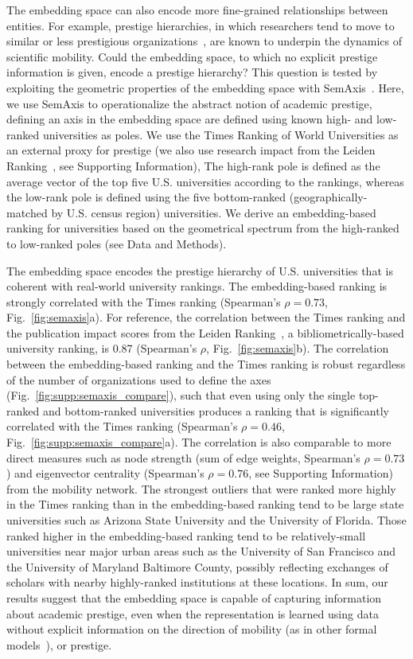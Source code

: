 \documentclass[12pt]{article} %
\def\SI{Supporting Information}
\begin{document}
The embedding space can also encode more fine-grained relationships between entities.
For example, prestige hierarchies, in which researchers tend to move to similar or less prestigious organizations~\autocite{deville2014career, clauset2015hierarchy}, are known to underpin the dynamics of scientific mobility.
Could the embedding space, to which no explicit prestige information is given, encode a prestige hierarchy?
This question is tested by exploiting the geometric properties of the embedding space with SemAxis~\autocite{an2018semaxis}.
Here, we use SemAxis to operationalize the abstract notion of academic prestige, defining an axis in the embedding space are defined using known high- and low-ranked universities as poles.
We use the Times Ranking of World Universities as an external proxy for prestige (we also use research impact from the Leiden Ranking~\autocite{waltman2012leidenrankings}, see \SI),
The high-rank pole is defined as the average vector of the top five U.S. universities according to the rankings, whereas the low-rank pole is defined using the five bottom-ranked (geographically-matched by U.S. census region) universities.
We derive an embedding-based ranking for universities based on the geometrical spectrum from the high-ranked to low-ranked poles (see Data and Methods).

The embedding space encodes the prestige hierarchy of U.S. universities that is coherent with real-world university rankings.
The embedding-based ranking is strongly correlated with the Times ranking (Spearman's $\rho = 0.73$, Fig.~\ref{fig:semaxis}a).
For reference, the correlation between the Times ranking and the publication impact scores from the Leiden Ranking~\autocite{waltman2012leidenrankings}, a bibliometrically-based university ranking, is 0.87 (Spearman's $\rho$, Fig.~\ref{fig:semaxis}b).
The correlation between the embedding-based ranking and the Times ranking is robust regardless of the number of organizations used to define the axes (Fig.~\ref{fig:supp:semaxis_compare}), such that even using only the single top-ranked and bottom-ranked universities produces a ranking that is significantly correlated with the Times ranking (Spearman's $\rho = 0.46$, Fig.~\ref{fig:supp:semaxis_compare}a).
The correlation is also comparable to more direct measures such as node strength (sum of edge weights, Spearman's $\rho = 0.73$) and eigenvector centrality (Spearman's $\rho = 0.76$, see \SI) from the mobility network.
The strongest outliers that were ranked more highly in the Times ranking than in the embedding-based ranking tend to be large state universities such as Arizona State University and the University of Florida.
Those ranked higher in the embedding-based ranking tend to be relatively-small universities near major urban areas such as the University of San Francisco and the University of Maryland Baltimore County, possibly reflecting exchanges of scholars with nearby highly-ranked institutions at these locations.
In sum, our results suggest that the embedding space is capable of capturing information about academic prestige, even when the representation is learned using data without explicit information on the direction of mobility (as in other formal models~\autocite{clauset2015hierarchy}), or prestige.
\end{document}
